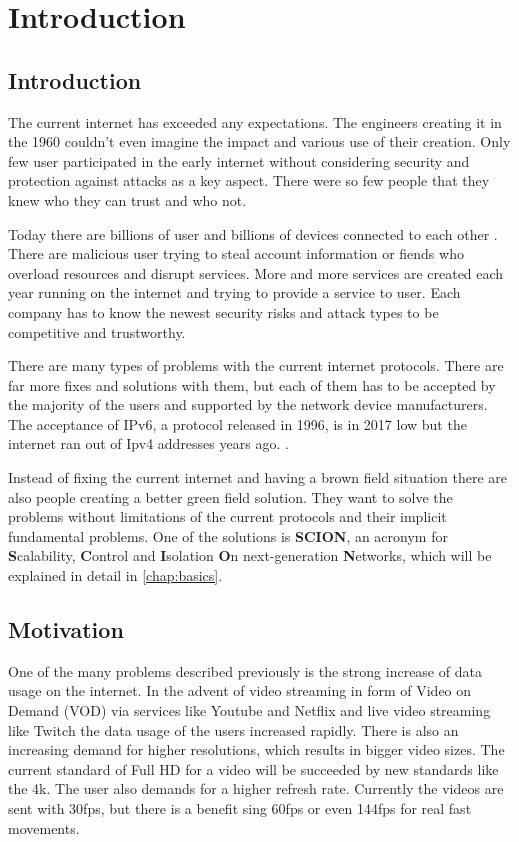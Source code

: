 \documentclass[thesis.tex]{subfiles}
\begin{document}
\chapter{Introduction}
\label{chap:introduction}


\section{Introduction}
The current internet  has exceeded any expectations. The engineers creating it in the 1960 couldn't even imagine the impact and various use of their creation. Only few user participated in the early internet without considering security and protection against attacks as a key aspect. There were so few people that they knew who they can trust and who not.

Today there are billions of user and billions of devices connected to each other . There are malicious user trying to steal account information or fiends who overload resources and disrupt services. More and more services are created each year running on the internet and trying to provide a service to user. Each company has to know the newest security risks and attack types to be competitive and trustworthy. 

There are many types of problems with the current internet protocols. There are far more fixes and solutions with them, but each of them has to be accepted by the majority of the users and supported by the network device manufacturers. The acceptance of IPv6, a protocol released in 1996, is in 2017 low but the internet ran out of Ipv4 addresses years ago. .

Instead of fixing the current internet and having a brown field situation there are also people creating a better green field solution. They want to solve the problems without limitations of the current protocols and their implicit fundamental problems. One of the solutions is \textbf{SCION}, an acronym for \textbf{S}calability, \textbf{C}ontrol and \textbf{I}solation \textbf{O}n next-generation \textbf{N}etworks, which will be explained in detail in \autoref{chap:basics}.


\section{Motivation}
One of the many problems described previously is the strong increase of data usage on the internet. In the advent of video streaming in form of Video on Demand (VOD) via services like Youtube and Netflix and live video streaming like Twitch the data usage of the users increased rapidly. There is also an increasing demand for higher resolutions, which results in bigger video sizes. The current standard of Full HD for a video will be succeeded by new standards like the 4k. The user also demands for a higher refresh rate. Currently the videos are sent with 30fps, but there is a benefit sing 60fps or even 144fps for real fast movements.
\end{document}
